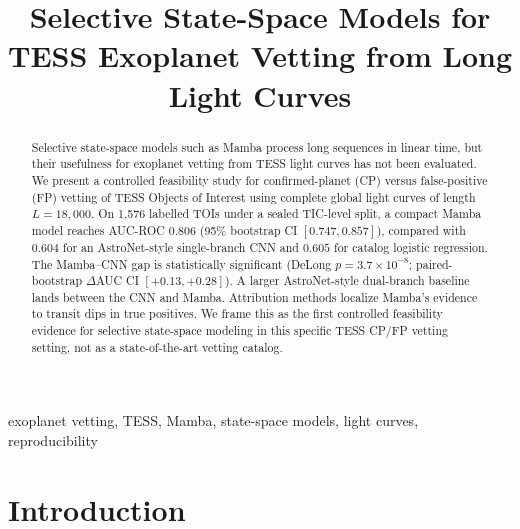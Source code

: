 \documentclass[conference]{IEEEtran}
\begin{document}
\title{Selective State-Space Models for TESS Exoplanet Vetting from Long Light
Curves}

\author{
}

\maketitle

\begin{abstract}
Selective state-space models such as Mamba process long sequences in linear time,
but their usefulness for exoplanet vetting from TESS light curves has not been
evaluated. We present a controlled feasibility study for confirmed-planet (CP)
versus false-positive (FP) vetting of TESS Objects of Interest using complete
global light curves of length $L=18{,}000$. On 1{,}576 labelled TOIs under a sealed
TIC-level split, a compact Mamba model reaches AUC-ROC $0.806$ (95\% bootstrap CI
$[0.747,0.857]$), compared with $0.604$ for an AstroNet-style single-branch CNN and
$0.605$ for catalog logistic regression. The Mamba--CNN gap is statistically
significant (DeLong $p=3.7\times10^{-8}$; paired-bootstrap $\Delta$AUC CI
$[+0.13,+0.28]$). A larger AstroNet-style dual-branch baseline lands between the CNN
and Mamba. Attribution methods localize Mamba's evidence to transit dips in true
positives. We frame this as the first controlled feasibility evidence for selective
state-space modeling in this specific TESS CP/FP vetting setting, not as a
state-of-the-art vetting catalog.
\end{abstract}

\begin{IEEEkeywords}
exoplanet vetting, TESS, Mamba, state-space models, light curves, reproducibility
\end{IEEEkeywords}

\section{Introduction}
\end{document}
